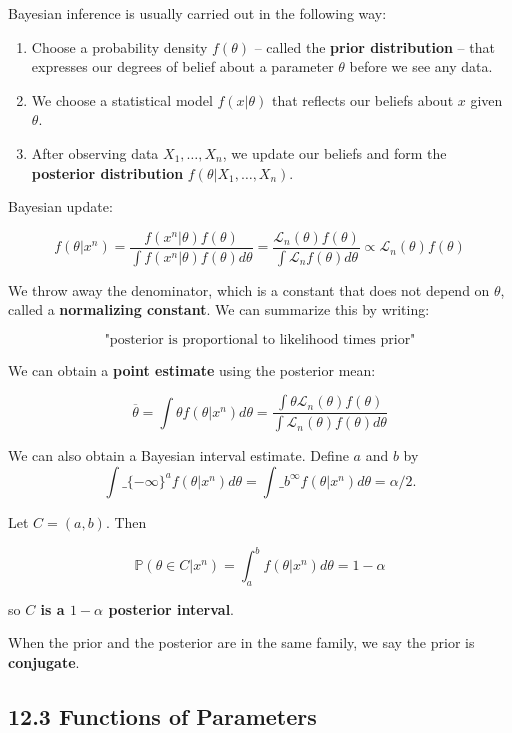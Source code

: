 Bayesian inference is usually carried out in the following way:

\begin{enumerate}[label={\arabic*.}]
\item
  Choose a probability density \(f(\theta)\) -- called the \textbf{prior
  distribution} -- that expresses our degrees of belief about a
  parameter \(\theta\) before we see any data.
\item
  We choose a statistical model \(f(x | \theta)\) that reflects our
  beliefs about \(x\) given \(\theta\).
\item
  After observing data \(X_{1}, \dots, X_{n}\), we update our beliefs and
  form the \textbf{posterior distribution}
  \(f(\theta | X_{1}, \dots, X_{n})\).
\end{enumerate}

Bayesian update:

\[f(\theta | x^{n}) = \frac{f(x^{n} | \theta) f(\theta)}{\int f(x^{n} | \theta) f(\theta) d\theta} 
= \frac{\mathcal{L}_{n}(\theta) f(\theta)}{\int \mathcal{L}_{n} f(\theta) d\theta}
\propto \mathcal{L}_{n}(\theta) f(\theta)\]

We throw away the denominator, which is a constant that does not depend
on \(\theta\), called a \textbf{normalizing constant}. We can summarize
this by writing:

\[ \text{"posterior is proportional to likelihood times prior"} \]

We can obtain a \textbf{point estimate} using the posterior mean:

\[ \overline{\theta} = \int \theta f(\theta | x^{n}) d\theta = \frac{\int \theta \mathcal{L}_{n}(\theta) f(\theta)}{\int \mathcal{L}_{n}(\theta) f(\theta) d\theta}\]

We can also obtain a Bayesian interval estimate. Define \(a\) and \(b\)
by 
\[ \int\_\{-\infty\}^{a} f(\theta |{} x^{n}) d\theta =
\int\_b^{\infty} f(\theta |{} x^{n}) d\theta = \alpha / 2.
\]

Let \(C = (a, b)\). Then

\[\mathbb{P}(\theta \in C | x^{n}) = \int_a^{b} f(\theta | x^{n}) d\theta = 1 - \alpha\]

so \textbf{\(C\) is a \(1 - \alpha\) posterior interval}.

When the prior and the posterior are in the same family, we say the
prior is \textbf{conjugate}.

\subsection*{12.3 Functions of
Parameters}\label{functions-of-parameters}

